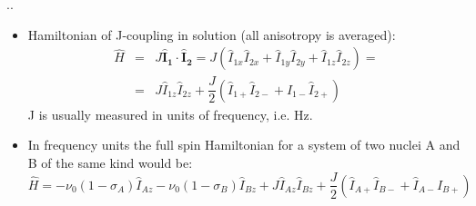 \documentclass{beamer}
\begin{document}
\begin{frame}{\thesection.\thesubsection. \insertsubsection}
	\begin{itemize}[<+>]
		\item 
			Hamiltonian of J-coupling in solution (all anisotropy is averaged):
			\begin{equation}
			\begin{array}{lcl}
			\hat{H}  &=& J \bm{\hat{I}_{1}} \cdot  \bm{\hat{I}_{2}} = J ( \hat{I}_{1x} \hat{I}_{2x} + \hat{I}_{1y} \hat{I}_{2y} + \hat{I}_{1z} \hat{I}_{2z}   ) =	\\
			&=&  J  \hat{I}_{1z} \hat{I}_{2z} +\dfrac{J}{2} (\hat{I}_{1+} \hat{I}_{2-} + \hat{I}_{1-} \hat{I}_{2+} )  	  
			\end{array}
			\end{equation}
			J is usually measured in units of frequency, i.e. Hz. 
			
		\item
		In frequency units the full spin Hamiltonian for a system of two nuclei A and B of the same kind would be:
		\begin{equation}
		\hat{H} = -\nu_0(1 - \sigma_A) \hat{I}_{Az} - \nu_0(1- \sigma_B) \hat{I}_{Bz} + J  \hat{I}_{Az} \hat{I}_{Bz} +\dfrac{J}{2} (\hat{I}_{A+} \hat{I}_{B-} + \hat{I}_{A-} \hat{I}_{B+} ) 
		\end{equation}
		
	\end{itemize}
		
	
\end{frame}
\end{document}
